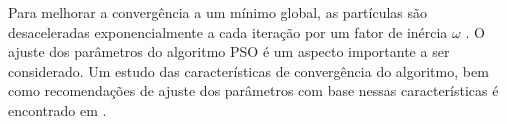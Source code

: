  Para melhorar a convergência a um mínimo global, as partículas são desaceleradas exponencialmente  a cada iteração por um fator de inércia $\omega$ \cite{Yuhui:1998}. O ajuste dos parâmetros do algoritmo \ac{PSO} é um aspecto importante a ser considerado. Um estudo das características de convergência do algoritmo, bem como recomendações de ajuste dos parâmetros com base nessas características  é encontrado em \cite{Jiang20078}.
  
 \begin{comment} 
\begin{algorithm}[ht]
\caption{Particle Swarm Optimization \label{alg:pso}}

\begin{algorithmic}
\Require $N\text{,}\:M > 0$,  $\:\omega \in (0,1]$, $\:c_1\text{,}\:c_2 \in R^+ $, $\:COST$
\Ensure The best found solution that minimizes $COST$
\For{$i = 0,\:1,\:\cdots,\:N-1$}
\For{$j = 0,\:1,\:\cdots,\:M-1$}
\State $pop[i][j] \gets U(0.125,125.5)$ 
\State $v[i][j] \gets U(0.125,125.5)$
\EndFor
\State $fit[i] \gets$ \Call{$COST$}{$\boldsymbol{pop}[i]$}
\State $\boldsymbol{bpp}[i] \gets \boldsymbol{pop}[i]$ 
\EndFor
\State $\boldsymbol{bgp} \gets \boldsymbol{bpp}[argmin(\boldsymbol{fit})]$
\For{$i = 0,\:1,\:\cdots,\:1250$}
\For{$j = 0,\:1,\:\cdots,\:N-1$}
\State $\boldsymbol{v}[j] \gets \omega.\boldsymbol{v}[j]$
\State $\boldsymbol{v}[j] \gets \boldsymbol{v}[j] + c1.U(0,1).(\boldsymbol{pop}[j] - \boldsymbol{bpp}[j])$
\State $\boldsymbol{v}[j] \gets \boldsymbol{v}[j] + c2.U(0,1).(\boldsymbol{pop}[j] - \boldsymbol{bgp})$
\State $\boldsymbol{pop}[j] \gets \boldsymbol{pop}[j] + \boldsymbol{v}[j]$
\For{$k = 0,\:1,\:\cdots,\:M-1$}
\If{$pop[j][k] \notin [0.125,125.0]$}
\State $pop[j][k] \gets U(0.125,125.0)$
\EndIf
\EndFor
\State $fit[j] \gets$ \Call{$COST$}{$\boldsymbol{pop}[j]$}
\If {$fit[j] <$ \Call{$COST$}{$\boldsymbol{bpp}[j]$}} 
\State $\boldsymbol{bpp}[j] \gets \boldsymbol{pop}[j]$
\EndIf
\If {\Call{$COST$}{$\boldsymbol{bpp}[j]$} $<$ \Call{$COST$}{$\boldsymbol{bgp}$}}
\State $\boldsymbol{bgp} \gets \boldsymbol{bpp}[j]$
\EndIf
\EndFor
\EndFor
\end{algorithmic}
\end{algorithm}
\end{comment}